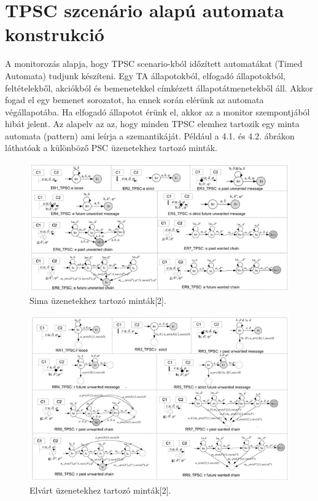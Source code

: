 \clearpage\section{TPSC szcenário alapú automata konstrukció}

A monitorozás alapja, hogy TPSC scenario-kból időzített automatákat (Timed Automata) tudjunk készíteni.
Egy TA állapotokból, elfogadó állapotokból, feltételekből, akciókból és bemenetekkel címkézett állapotátmenetekből áll.
Akkor fogad el egy bemenet sorozatot, ha ennek során elérünk az automata végállapotába.
Ha elfogadó állapotot érünk el, akkor az a monitor szempontjából hibát jelent.
Az alapelv az az, hogy minden TPSC elemhez tartozik egy minta automata (pattern) ami leírja a szemantikáját.
Például a 4.1. és 4.2. ábrákon láthatóak a különböző PSC üzenetekhez tartozó minták.

\begin{figure}[!ht]
    \centering
    \includegraphics[width=150mm, keepaspectratio]{figures/5abra.png}
    \caption{Sima üzenetekhez tartozó minták[2].}
\end{figure}

\begin{figure}[!ht]
    \centering
    \includegraphics[width=150mm, keepaspectratio]{figures/6abra.png}
    \caption{Elvárt üzenetekhez tartozó minták[2].}
\end{figure}

